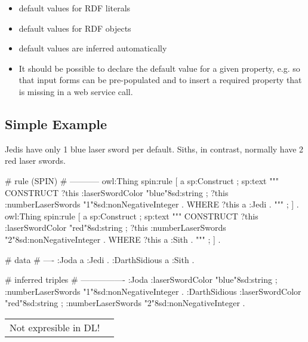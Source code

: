 \documentclass{llncs}
\newenvironment{DL}{
  \vspace{0cm}
	\begin{center}
  \begin{tabular}{r l}

}{
  \end{tabular}
	\end{center}
}
\begin{document}
\begin{itemize}
	\item default values for RDF literals
	\item default values for RDF objects
	\item default values are inferred automatically
	\item It should be possible to declare the default value for a given property, e.g. so that input forms can be pre-populated and to insert a required property that is missing in a web service call. 
\end{itemize}

\subsection{Simple Example}

Jedis have only 1 blue laser sword per default.
Siths, in contrast, normally have 2 red laser swords.

\begin{ex}
# rule (SPIN)
# -----------
owl:Thing
    spin:rule [
        a sp:Construct ;
            sp:text """
                CONSTRUCT {            
                    ?this :laserSwordColor "blue"^^xsd:string ;
                    ?this :numberLaserSwords "1"^^xsd:nonNegativeInteger . 
                }
                WHERE {             
                    ?this a :Jedi .            
                } """ ; ] .
owl:Thing
    spin:rule [
        a sp:Construct ;
            sp:text """
                CONSTRUCT {
                    ?this :laserSwordColor "red"^^xsd:string ;
                    ?this :numberLaserSwords "2"^^xsd:nonNegativeInteger . 
                }
                WHERE {             
                    ?this a :Sith .            
                } """ ; ] .
\end{ex}

\begin{ex}
# data
# ----
:Joda a :Jedi .
:DarthSidious a :Sith .
\end{ex}

\begin{ex}
# inferred triples
# ----------------
:Joda 
    :laserSwordColor "blue"^^xsd:string ;
    :numberLaserSwords "1"^^xsd:nonNegativeInteger .
:DarthSidious 
    :laserSwordColor "red"^^xsd:string ;
    :numberLaserSwords "2"^^xsd:nonNegativeInteger .
\end{ex}

\begin{DL}
Not expresible in DL!
\end{DL}
\end{document}
